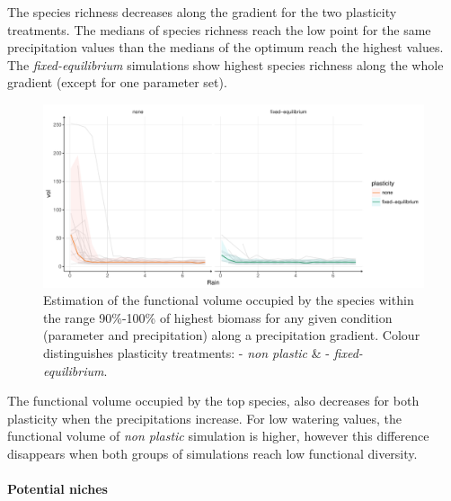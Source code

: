 The species richness decreases along the gradient for the two plasticity treatments. The medians of species richness reach the low point for the same precipitation values than the medians of the optimum reach the highest values. The \textit{fixed-equilibrium} simulations show highest species richness along the whole gradient (except for one parameter set).

\begin{figure}\label{fig:functional_div_grad}
\includegraphics[width = \textwidth]{./2_PP/Figures/Rain/gradient_plot_fdiv10.pdf}
\caption[Functional diversity of the best performing species along a precipitation gradient]{Estimation of the functional volume occupied by the species within the range 90\%-100\% of highest biomass for any given condition (parameter and precipitation) along a precipitation gradient.  Colour distinguishes plasticity treatments: \textcolor{myOrange}{- \textit{non plastic}} \&  \textcolor{myGreen}{- \textit{fixed-equilibrium}}.} \end{figure}

The functional volume occupied by the top species, also decreases for both plasticity when the precipitations increase. For low watering values, the functional volume of \textit{non plastic} simulation is higher, however this difference disappears when both groups of simulations reach low functional diversity.

\paragraph{Potential niches}


